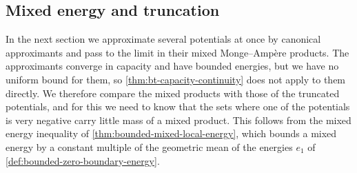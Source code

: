 \subsection{Mixed energy and truncation}
\label{sec:mixed-local-energy}
In the next section we approximate several potentials at once by canonical approximants and pass to the limit in their mixed Monge--Amp\`ere products. The approximants converge in capacity and have bounded energies, but we have no uniform bound for them, so \cref{thm:bt-capacity-continuity} does not apply to them directly. We therefore compare the mixed products with those of the truncated potentials, and for this we need to know that the sets where one of the potentials is very negative carry little mass of a mixed product. This follows from the mixed energy inequality of \cref{thm:bounded-mixed-local-energy}, which bounds a mixed energy by a constant multiple of the geometric mean of the energies $e_1$ of \cref{def:bounded-zero-boundary-energy}.


